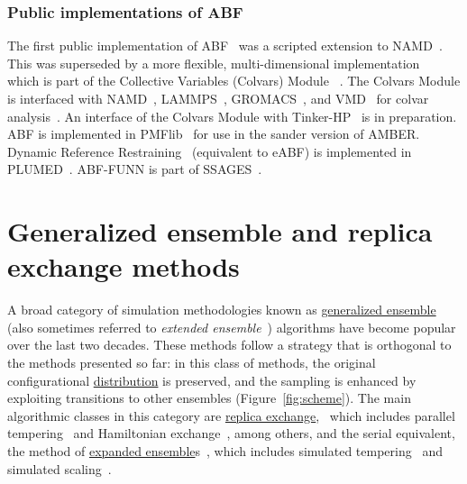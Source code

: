 \documentclass[9pt,review]{livecoms}
\begin{document}
\subsubsection{Public implementations of ABF}

The first public implementation of ABF~\cite{Henin2004} was a scripted extension to NAMD~\cite{Phillips2020}.
This was superseded by a more flexible, multi-dimensional implementation~\cite{Henin2010a} which is part of the Collective Variables (Colvars) Module ~\cite{Fiorin2013}.
The Colvars Module is interfaced with NAMD~\cite{Phillips2020}, LAMMPS~\cite{Plimpton1995}, GROMACS~\cite{Abraham2015}, and VMD~\cite{Humphrey1996} for colvar analysis~\cite{Henin2022dashboard}.
An interface of the Colvars Module with Tinker-HP~\cite{Lagardere2018} is in preparation.
ABF is implemented in PMFlib~\cite{kulhanek2011pmflib} for use in the sander version of AMBER.
Dynamic Reference Restraining~\cite{Zheng2012} (equivalent to eABF) is implemented in PLUMED~\cite{Tribello2014}.
ABF-FUNN is part of SSAGES~\cite{Sidky2018}.



\section{Generalized ensemble and replica exchange methods}
\label{sec:generalized-ensemble}

A broad category of simulation methodologies known as \hyperlink{ref:GenEns} {generalized ensemble}~\cite{okamoto:biopolymers:2001:generalized-ensemble} (also sometimes referred to \emph{extended ensemble}~\cite{iba:intl-j-mod-phys-c:2001:extended-ensemble}) algorithms have become popular over the last two decades. These methods follow a strategy that is orthogonal to the methods presented so far: in this class of methods, the original configurational \hyperlink{ref:Distribution} {distribution}  is preserved, and the sampling is enhanced by exploiting transitions to other ensembles (Figure~\ref{fig:scheme}). 
The main  algorithmic classes in this category are \hyperlink{ref:ReplEx} {replica exchange},~\cite{geyer:conference-proceedings:1991:replica-exchange} which includes parallel tempering~\cite{hukushima-nemoto:j-phys-soc-jpn:1996:parallel-tempering,hansmann:chem-phys-lett:1997:parallel-tempering-monte-carlo,sugita-okamoto:chem-phys-lett:1999:parallel-tempering-md} and Hamiltonian exchange~\cite{sugita-kitao-okamoto:jcp:2000:hamiltonian-exchange,fukunishi-watanabe-takada:jcp:2002:hamiltonian-exchange,jang-shin-pak:prl:2003:hamiltonian-exchange,kwak-hansmann:prl:2005:hamiltonian-exchange}, among others, and the serial equivalent, the method of \hyperlink{ref:ExpEns} {expanded ensemble}s~\cite{lyubartsev:jcp:1992:expanded-ensembles}, which includes simulated tempering~\cite{marinari-parisi:europhys-lett:1992:simulated-tempering,geyer-thompson:j-am-stat-assoc:1995:expanded-ensembles} and simulated scaling~\cite{li-fajer-yang:jcp:2007:simulated-scaling}.
\end{document}
